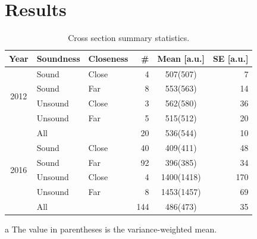 \documentclass[reprint, superscriptaddress]{revtex4-1}
\begin{document}
\section{Results}
\begin{table}
\centering
\begin{threeparttable}
\caption{Cross section summary statistics. \label{tbl:CS-all}}
\begin{tabular}{c|llrcr}
\hline\hline
Year						& Soundness		& Closeness		& \#		& Mean\tnote{a} [a.u.]	& SE [a.u.] \\
\hline
\multirow{4}{*}{2012}		& Sound			& Close			& 4			& 507(507)				& 7  \\
							& Sound			& Far			& 8			& 553(563)				& 14 \\
							& Unsound		& Close			& 3			& 562(580)				& 36 \\
							& Unsound		& Far			& 5			& 515(512)				& 20 \\
							& All			& 				& 20		& 536(544)				& 10 \\
\hline					
\multirow{4}{*}{2016}		& Sound			& Close			& 40		& 409(411)				& 48 \\
							& Sound			& Far			& 92		& 396(385)				& 34 \\
							& Unsound		& Close			& 4			& 1400(1418)			& 170\\
							& Unsound		& Far			& 8			& 1453(1457)			& 69 \\
							& All			& 				& 144		& 486(473)				& 35 \\
\hline\hline
\end{tabular}
\begin{tablenotes}
\item[a] The value in parentheses is the variance-weighted mean.
\end{tablenotes}
\end{threeparttable}
\end{table}
\end{document}

